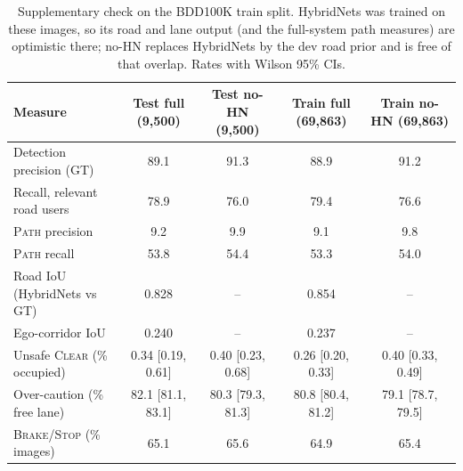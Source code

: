 \begin{table}[t]
\centering
\caption{Supplementary check on the BDD100K train split. HybridNets was trained on these images, so its road and lane output (and the full-system path measures) are optimistic there; no-HN replaces HybridNets by the dev road prior and is free of that overlap. Rates with Wilson 95\% CIs.}
\label{tab:train}
\footnotesize
\setlength{\tabcolsep}{3pt}
\begin{tabular}{lcccc}
\hline
Measure & Test full (9{,}500) & Test no-HN (9{,}500) & Train full (69{,}863) & Train no-HN (69{,}863) \\
\hline
Detection precision (GT) & 89.1 & 91.3 & 88.9 & 91.2 \\
Recall, relevant road users & 78.9 & 76.0 & 79.4 & 76.6 \\
\textsc{Path} precision & 9.2 & 9.9 & 9.1 & 9.8 \\
\textsc{Path} recall & 53.8 & 54.4 & 53.3 & 54.0 \\
Road IoU (HybridNets vs GT) & 0.828 & -- & 0.854 & -- \\
Ego-corridor IoU & 0.240 & -- & 0.237 & -- \\
\hline
Unsafe \textsc{Clear} (\% occupied) & 0.34 [0.19, 0.61] & 0.40 [0.23, 0.68] & 0.26 [0.20, 0.33] & 0.40 [0.33, 0.49] \\
Over-caution (\% free lane) & 82.1 [81.1, 83.1] & 80.3 [79.3, 81.3] & 80.8 [80.4, 81.2] & 79.1 [78.7, 79.5] \\
\textsc{Brake}/\textsc{Stop} (\% images) & 65.1 & 65.6 & 64.9 & 65.4 \\
\hline
\end{tabular}
\end{table}
